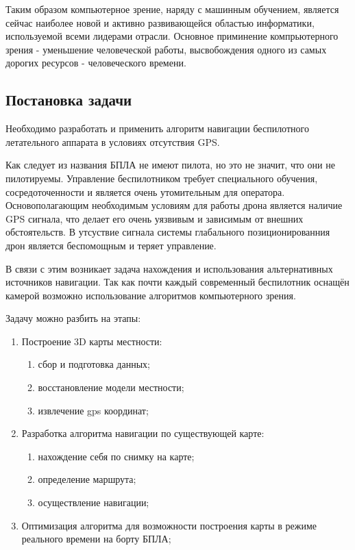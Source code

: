     \vspace{1em}
    
    Таким образом компьютерное зрение, наряду с машинным обучением, является сейчас наиболее новой и активно развивающейся областью информатики, используемой всеми лидерами отрасли. Основное приминение компрьютерного зрения - уменьшение человеческой работы, высвобождения одного из самых дорогих ресурсов - человеческого времени.
    
    \subsection*{Постановка задачи}
    
    \tab Необходимо разработать и применить алгоритм навигации беспилотного летательного аппарата в условиях отсутствия GPS.
    
    Как следует из названия БПЛА не имеют пилота, но это не значит, что они не пилотируемы. Управление беспилотником требует специального обучения, сосредоточенности и является очень утомительным для оператора. Основополагающим необходимым условиям для работы дрона является наличие GPS сигнала, что делает его очень уязвивым и зависимым от внешних обстоятельств. В утсуствие сигнала системы глабального позиционированния дрон является беспомощным и теряет управление.
    
    \vspace{1em}
    
     В связи с этим возникает задача нахождения и использования альтернативных источников навигации. Так как почти каждый современный беспилотник оснащён камерой возможно использование алгоритмов компьютерного зрения.
     
     \vspace{1em}
     
     Задачу можно разбить на этапы:
     \begin{enumerate}
         \item Построение 3D карты местности:
         \begin{enumerate}
            \item сбор и подготовка данных;
            \item восстановление модели местности;
            \item извлечение gps координат;
         \end{enumerate}
         \item Разработка алгоритма навигации по существующей карте:
         \begin{enumerate}
            \item нахождение себя по снимку на карте;
            \item определение маршрута;
            \item осуществление навигации;
         \end{enumerate}
         \item Оптимизация алгоритма для возможности построения карты в режиме реального времени на борту БПЛА;
     \end{enumerate}
    
